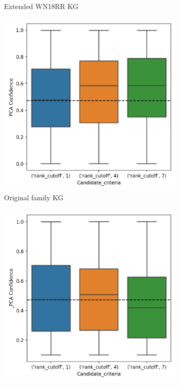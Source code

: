 \begin{figure}[!htb]
\begin{subfigure}{.5\textwidth}
  \caption{Extended WN18RR KG}
  \label{fig:_PCA_rank_wn18rr_boxplot_sub}
\end{subfigure}
\begin{subfigure}{.5\textwidth}
  \centering
  \includegraphics[width=1\linewidth]{figures/results/ranks/PCA-rank_family.png}
  \caption{Original family KG}
  \label{fig:models_rank_boxplot_sub}
\end{subfigure}%
\begin{subfigure}{.5\textwidth}
  \centering
  \includegraphics[width=1\linewidth]{figures/results/ranks/_PCA-rank_family.png}

\end{subfigure}
\end{figure}
